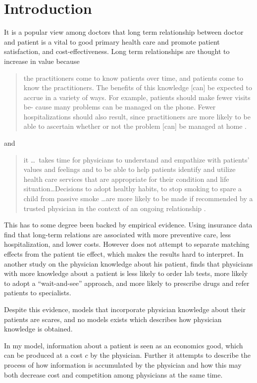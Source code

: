 \section{Introduction}
It is a popular view among doctors that long term relationship between doctor and patient is a vital to good primary health care and promote patient satisfaction, and cost-effectiveness. Long term relationships are thought to increase in value because
\begin{quotation}
the practitioners come to know patients over time, and patients come to know the practitioners. The benefits of this knowledge [can] be expected to accrue in a variety of ways. For example, patients should make fewer visits be- cause many problems can be managed on the phone. Fewer hospitalizations should also result, since practitioners are more likely to be able to ascertain whether or not the problem [can] be managed at home \parencite[p. 41--42]{Starfield1992}.
\end{quotation}
and
\begin{quotation}
it \ldots \ takes time for physicians to understand and empathize with patients' values and feelings and to be able to help patients identify and utilize health care services that are appropriate for their condition and life situation\ldots Decisions to adopt healthy habits, to stop smoking to spare a child from passive smoke \ldots are more likely to be made if recommended by a trusted physician in the context of an ongoing relationship \parencite[p. 324--235]{Emanuel1995}.
\end{quotation}
This has to some degree been backed by empirical evidence. Using insurance data \textcite{Weiss1996} find that long-term relations are associated with more preventive care, less hospitalization, and lower costs. However \citeauthor{Weiss1996} does not attempt to separate matching effects from the patient tie effect, which makes the results hard to interpret. In another study on the physician knowledge about his patient,   \textcite{Hjortdahl1991}  finds that physicians with more knowledge about a patient is less likely to order lab tests, more likely to adopt a ``wait-and-see'' approach, and more likely to prescribe drugs and refer patients to specialists.

Despite this evidence, models that incorporate physician knowledge about their patients are scares, and no models exists which describes how physician knowledge is obtained.

In my model, information about a patient is seen as an economics good, which can be produced at a cost \(c\) by the physician. Further it attempts to describe the process of how information is accumulated by the physician and how this may both decrease cost and competition among physicians at the same time.

